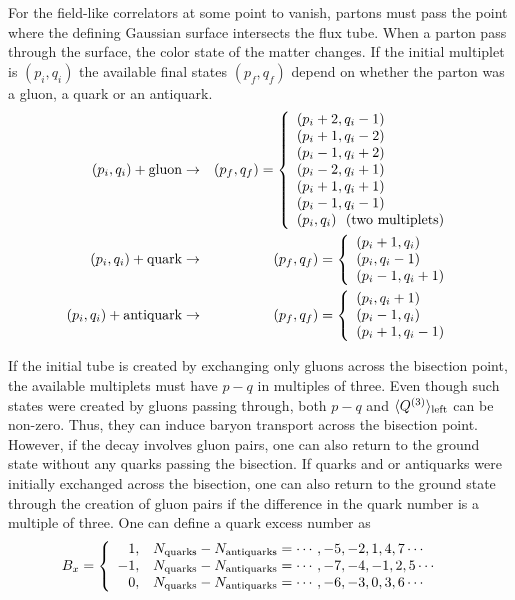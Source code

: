 \documentclass[aps, prc, 12pt, nofootinbib, showpacs, superscriptaddress, tightenlines, groupedaddress]{revtex4-2}
\begin{document}
For the field-like correlators at some point to vanish, partons must pass the point where the defining Gaussian surface intersects the flux tube. When a parton pass through the surface, the color state of the matter changes. If the initial multiplet is $(p_i,q_i)$ the available final states $(p_f,q_f)$ depend on whether the parton was a gluon, a quark or an antiquark.
\begin{eqnarray}
(p_i,q_i)+{\rm gluon}&\rightarrow& (p_f,q_f)=\left\{
\begin{array}{l}
(p_i+2,q_i-1)\\
(p_i+1,q_i-2)\\
(p_i-1,q_i+2)\\
(p_i-2,q_i+1)\\
(p_i+1,q_i+1)\\
(p_i-1,q_i-1)\\
(p_i,q_i)~~({\rm two~multiplets})
\end{array}
\right.\\
\nonumber
(p_i,q_i)+{\rm quark}&\rightarrow& (p_f,q_f)=\left\{
\begin{array}{l}
(p_i+1,q_i)\\
(p_i,q_i-1)\\
(p_i-1,q_i+1)
\end{array}
\right.\\
\nonumber
(p_i,q_i)+{\rm antiquark}&\rightarrow& (p_f,q_f)=\left\{\begin{array}{l}
(p_i,q_i+1)\\
(p_i-1,q_i)\\
(p_i+1,q_i-1)
\end{array}
\right.
\end{eqnarray}

If the initial tube is created by exchanging only gluons across the bisection point, the available multiplets must have $p-q$ in multiples of three. Even though such states were created by gluons passing through, both $p-q$ and $\langle Q^{(3)}\rangle_{\rm left}$ can be non-zero. Thus, they can induce baryon transport across the bisection point. However, if the decay involves gluon pairs, one can also return to the ground state without any quarks passing the bisection. If quarks and or antiquarks were initially exchanged across the bisection, one can also return to the ground state through the creation of gluon pairs if the difference in the quark number is a multiple of three. One can define a quark excess number as
\begin{eqnarray}
B_x&=\left\{\begin{array}{rl}
1,&N_{\rm quarks}-N_{\rm antiquarks}=\cdots,-5,-2,1,4,7\cdots\\
-1,&N_{\rm quarks}-N_{\rm antiquarks}=\cdots,-7,-4,-1,2,5\cdots\\
0, &N_{\rm quarks}-N_{\rm antiquarks}=\cdots,-6,-3,0,3,6\cdots
\end{array}\right.
\end{eqnarray}
\end{document}
